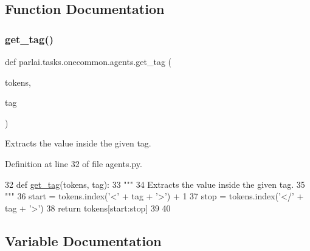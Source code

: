\subsection{Function Documentation}
\mbox{\label{namespaceparlai_1_1tasks_1_1onecommon_1_1agents_ad40f47306fdc2563ccac42a81c5620f6}} 
\subsubsection{\texorpdfstring{get\+\_\+tag()}{get\_tag()}}
{\footnotesize\ttfamily def parlai.\+tasks.\+onecommon.\+agents.\+get\+\_\+tag (\begin{DoxyParamCaption}\item[{}]{tokens,  }\item[{}]{tag }\end{DoxyParamCaption})}

\begin{DoxyVerb}Extracts the value inside the given tag.
\end{DoxyVerb}
 

Definition at line 32 of file agents.\+py.


\begin{DoxyCode}
32 \textcolor{keyword}{def }\hyperlink{namespaceparlai_1_1tasks_1_1onecommon_1_1agents_ad40f47306fdc2563ccac42a81c5620f6}{get\_tag}(tokens, tag):
33     \textcolor{stringliteral}{"""}
34 \textcolor{stringliteral}{    Extracts the value inside the given tag.}
35 \textcolor{stringliteral}{    """}
36     start = tokens.index(\textcolor{stringliteral}{'<'} + tag + \textcolor{stringliteral}{'>'}) + 1
37     stop = tokens.index(\textcolor{stringliteral}{'</'} + tag + \textcolor{stringliteral}{'>'})
38     \textcolor{keywordflow}{return} tokens[start:stop]
39 
40 
\end{DoxyCode}


\subsection{Variable Documentation}
\mbox{\label{namespaceparlai_1_1tasks_1_1onecommon_1_1agents_ac0fd84abd4f5ce27812c259aad1750dc}} 
